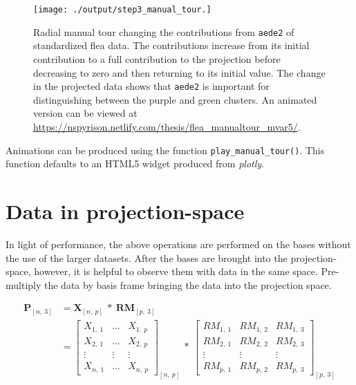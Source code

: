 \documentclass{monashthesis}
\begin{document}
\begin{figure}

{\centering \texttt{[image: ./output/step3\_manual\_tour.]} 

}

\caption{Radial manual tour changing the contributions from \texttt{aede2} of standardized flea data. The contributions increase from its initial contribution to a full contribution to the projection before decreasing to zero and then returning to its initial value. The change in the projected data shows that \texttt{aede2} is important for distinguishing between the purple and green clusters. An animated version can be viewed at \url{https://nspyrison.netlify.com/thesis/flea_manualtour_mvar5/}.}\label{fig:step3}
\end{figure}

Animations can be produced using the function \texttt{play\_manual\_tour()}. This function defaults to an HTML5 widget produced from \emph{plotly}.

\hypertarget{sec:display}{%
\section{Data in projection-space}\label{sec:display}}

In light of performance, the above operations are performed on the bases without the use of the larger datasets. After the bases are brought into the projection-space, however, it is helpful to observe them with data in the same space. Pre-multiply the data by basis frame bringing the data into the projection space.

\begin{align}
  \textbf{P}_{[n,~3]}
    &= \textbf{X}_{[n,~p]} ~*~ \textbf{RM}_{[p,~3]} \\
    &=
      \begin{bmatrix}
          X_{1,~1} & \dots & X_{1,~p} \\
          X_{2,~1} & \dots & X_{2,~p} \\
          \vdots   & \vdots & \vdots  \\
          X_{n,~1} & \dots & X_{n,~p}
      \end{bmatrix}_{[n,~p]}
      ~*~
      \begin{bmatrix}
        RM_{1,~1} & RM_{1,~2} & RM_{1,~3} \\
        RM_{2,~1} & RM_{2,~2} & RM_{2,~3} \\
        \vdots     & \vdots     & \vdots  \\
        RM_{p,~1} & RM_{p,~2} & RM_{p,~3}
      \end{bmatrix}_{[p,~3]}
\end{align}
\end{document}
